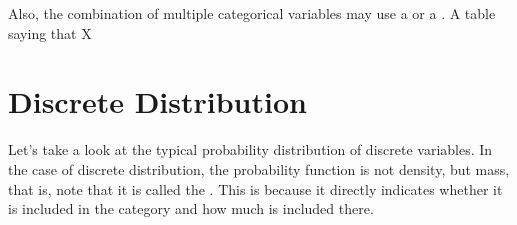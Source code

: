 \documentclass{ltjsbook}
\begin{document}
Also, the combination of multiple categorical variables may use a  or a . A table saying that X%

\section{Discrete Distribution}
\label{DDist}
Let's take a look at the typical  {probability distribution} of discrete variables. In the case of discrete distribution, the probability function is not density, but mass, that is, note that it is called the . This is because it directly indicates whether it is included in the category and how much is included there.


\end{document}
